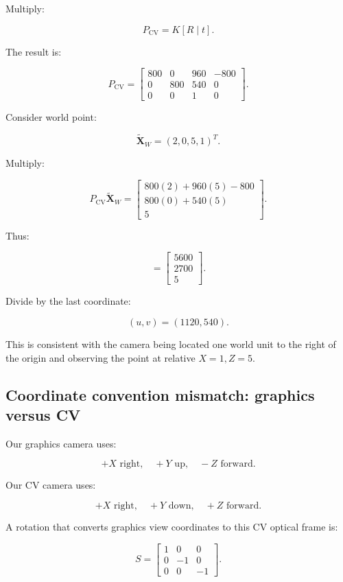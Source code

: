 Multiply:

\[
 P_{\mathrm{CV}}= K[R\mid t].
\]

The result is:

\[
 \boxed{ P_{\mathrm{CV}}= \begin{bmatrix} 800&0&960&-800\\ 0&800&540&0\\ 0&0&1&0 \end{bmatrix} }.
\]

Consider world point:

\[
 \tilde{\mathbf X}_W=(2,0,5,1)^T.
\]

Multiply:

\[
 P_{\mathrm{CV}}\tilde{\mathbf X}_W = \begin{bmatrix} 800(2)+960(5)-800\\ 800(0)+540(5)\\ 5 \end{bmatrix}.
\]

Thus:

\[
 = \begin{bmatrix} 5600\\2700\\5 \end{bmatrix}.
\]

Divide by the last coordinate:

\[
 \boxed{ (u,v)=(1120,540) }.
\]

This is consistent with the camera being located one world unit to the right of the origin and observing the point at relative \(X=1,Z=5\).

\subsection{Coordinate convention mismatch: graphics versus CV}\label{02-foundations-ii-ch035-coordinate-convention-mismatch-graphics-versus-cv}

Our graphics camera uses:

\[
 +X\text{ right},\quad+Y\text{ up},\quad-Z\text{ forward}.
\]

Our CV camera uses:

\[
 +X\text{ right},\quad+Y\text{ down},\quad+Z\text{ forward}.
\]

A rotation that converts graphics view coordinates to this CV optical frame is:

\[
 \boxed{ S= \begin{bmatrix} 1&0&0\\ 0&-1&0\\ 0&0&-1 \end{bmatrix} }.
\]


